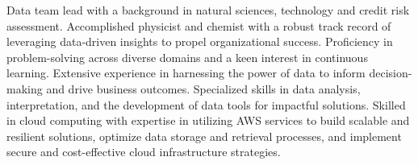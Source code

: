 \documentclass[11pt, letterpaper, sans]{moderncv}
\begin{document}
\maketitle

\small{
Data team lead with a background in natural sciences, technology and credit risk assessment. Accomplished physicist and chemist with a robust track record of leveraging data-driven insights to propel organizational success. Proficiency in problem-solving across diverse domains and a keen interest in continuous learning. Extensive experience in harnessing the power of data to inform decision-making and drive business outcomes. Specialized skills in data analysis, interpretation, and the development of data tools for impactful solutions. Skilled in cloud computing with expertise in utilizing AWS services to build scalable and resilient solutions, optimize data storage and retrieval processes, and implement secure and cost-effective cloud infrastructure strategies.
}
\end{document}
